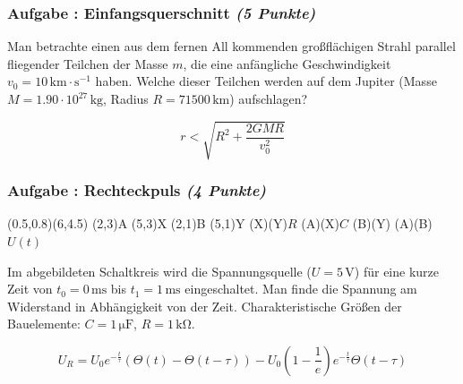 \documentclass[12pt,a4paper]{article}
\newcommand{\ee}[1]{\cdot 10^{#1}}
\newcommand{\unit}[1]{\,\mathrm{#1}}
\newcommand{\skizze}[1]{
\begin{center}
#1
\end{center}
}
\newcounter{numlabel}
\newenvironment{problem}[2]{\stepcounter{numlabel} \vspace{1ex} \subsubsection*{Aufgabe \the\value{numlabel}: #1 \emph{(#2 Punkte)}} \renewcommand{\Currentlabel}{Aufgabe \the\value{numlabel}: #1}}{

}
\begin{document}
\begin{problem}{Einfangsquerschnitt}{5}
Man betrachte einen aus dem fernen All kommenden großflächigen Strahl parallel fliegender Teilchen der Masse $m$, die eine anfängliche Geschwindigkeit $v_0=10 \unit{km \cdot s^{-1}}$ haben. Welche dieser Teilchen werden auf dem Jupiter (Masse $M=1.90 \ee{27} \unit{kg}$, Radius $R=71500 \unit{km}$) aufschlagen?

\begin{solution}
\[
r<\sqrt{R^2+\frac{2 GMR}{v_0^2}}
\]
\end{solution}
\end{problem}

\begin{problem}{Rechteckpuls}{4}
\skizze{
\begin{pspicture}(0.5,0.8)(6,4.5)
 \pnode(2,3){A}
 \pnode(5,3){X}
 \pnode(2,1){B}
 \pnode(5,1){Y}
 \resistor(X)(Y){$R$}
 \capacitor[labeloffset=1](A)(X){$C$}
 \wire(B)(Y)
 \tension(A)(B){$U(t)$}
\end{pspicture}
}
Im abgebildeten Schaltkreis wird die Spannungsquelle ($U=5 \unit{V}$) für eine kurze Zeit von $t_0 = 0 \unit{ms}$ bis $t_1 = 1 \unit{ms}$ eingeschaltet. Man finde die Spannung am Widerstand in Abhängigkeit von der Zeit. Charakteristische Größen der Bauelemente: $C=1 \unit{\mu F}$, $R=1 \unit{k\Omega}$.

\begin{solution}
\[
U_R=U_0 e^{-\frac t \tau} (\Theta(t)-\Theta(t-\tau))-U_0 (1-\frac 1e) e^{-\frac t \tau} \Theta(t-\tau)
\]
\end{solution}
\end{problem}
\end{document}
